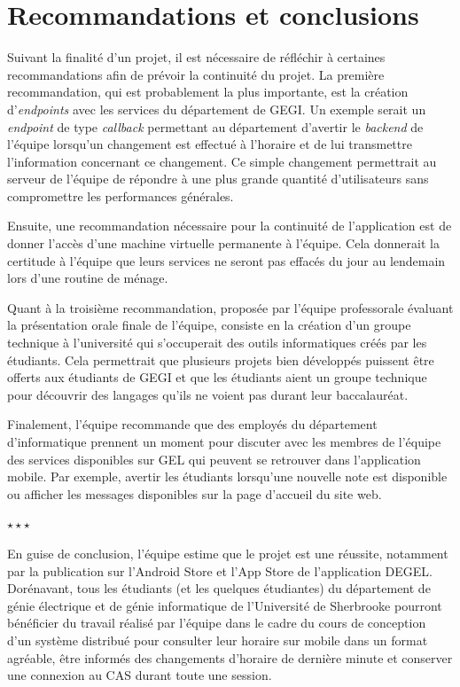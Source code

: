 \section{Recommandations et conclusions}
Suivant la finalité d'un projet, il est nécessaire de réfléchir à certaines recommandations afin de prévoir la continuité du projet. La première recommandation, qui est probablement la plus importante, est la création d'\emph{endpoints} avec les services du département de GEGI. Un exemple serait un \emph{endpoint} de type \emph{callback} permettant au département d'avertir le \emph{backend} de l'équipe lorsqu'un changement est effectué à l'horaire et de lui transmettre l'information concernant ce changement. Ce simple changement permettrait au serveur de l'équipe de répondre à une plus grande quantité d'utilisateurs sans compromettre les performances générales.

Ensuite, une recommandation nécessaire pour la continuité de l'application est de donner l'accès d'une machine virtuelle permanente à l'équipe. Cela donnerait la certitude à l'équipe que leurs services ne seront pas effacés du jour au lendemain lors d'une routine de ménage.

Quant à la troisième recommandation, proposée par l'équipe professorale évaluant la présentation orale finale de l'équipe, consiste en la création d'un groupe technique à l'université qui s'occuperait des outils informatiques créés par les étudiants. Cela permettrait que plusieurs projets bien développés puissent être offerts aux étudiants de GEGI et que les étudiants aient un groupe technique pour découvrir des langages qu'ils ne voient pas durant leur baccalauréat.

Finalement, l'équipe recommande que des employés du département d'informatique prennent un moment pour discuter avec les membres de l'équipe des services disponibles sur GEL qui peuvent se retrouver dans l'application mobile. Par exemple, avertir les étudiants lorsqu'une nouvelle note est disponible ou afficher les messages disponibles sur la page d'accueil du site web.

{%
\centering%
$\star\star\star$
\par%
}

En guise de conclusion, l'équipe estime que le projet est une réussite, notamment par la publication sur l'Android Store et l'App Store de l'application DEGEL. Dorénavant, tous les étudiants (et les quelques étudiantes) du département de génie électrique et de génie informatique de l'Université de Sherbrooke pourront bénéficier du travail réalisé par l'équipe dans le cadre du cours de conception d'un système distribué pour consulter leur horaire sur mobile dans un format agréable, être informés des changements d'horaire de dernière minute et conserver une connexion au CAS durant toute une session.

